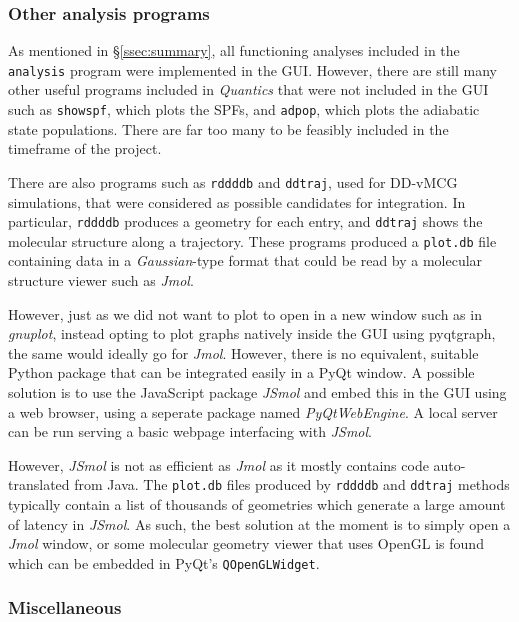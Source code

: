 \documentclass[12pt]{article}
\begin{document}
\subsubsection{Other analysis programs}

As mentioned in \S\ref{ssec:summary}, all functioning analyses included in the \texttt{analysis} program were implemented in the GUI. However, there are still many other useful programs included in \textit{Quantics} that were not included in the GUI such as \texttt{showspf}, which plots the SPFs, and \texttt{adpop}, which plots the adiabatic state populations. There are far too many to be feasibly included in the timeframe of the project.

There are also programs such as \texttt{rddddb} and \texttt{ddtraj}, used for DD-vMCG simulations, that were considered as possible candidates for integration. In particular, \texttt{rddddb} produces a geometry for each entry, and \texttt{ddtraj} shows the molecular structure along a trajectory. These programs produced a \texttt{plot.db} file containing data in a \textit{Gaussian}-type format that could be read by a molecular structure viewer such as \textit{Jmol}.

However, just as we did not want to plot to open in a new window such as in \textit{gnuplot}, instead opting to plot graphs natively inside the GUI using pyqtgraph, the same would ideally go for \textit{Jmol}. However, there is no equivalent, suitable Python package that can be integrated easily in a PyQt window. A possible solution is to use the JavaScript package \textit{JSmol} and embed this in the GUI using a web browser, using a seperate package named \textit{PyQtWebEngine}. A local server can be run serving a basic webpage interfacing with \textit{JSmol}.

However, \textit{JSmol} is not as efficient as \textit{Jmol} as it mostly contains code auto-translated from Java. The \texttt{plot.db} files produced by \texttt{rddddb} and \texttt{ddtraj} methods typically contain a list of thousands of geometries which generate a large amount of latency in \textit{JSmol}. As such, the best solution at the moment is to simply open a \textit{Jmol} window, or some molecular geometry viewer that uses OpenGL is found which can be embedded in PyQt's \texttt{QOpenGLWidget}.

\subsubsection{Miscellaneous}
\end{document}
